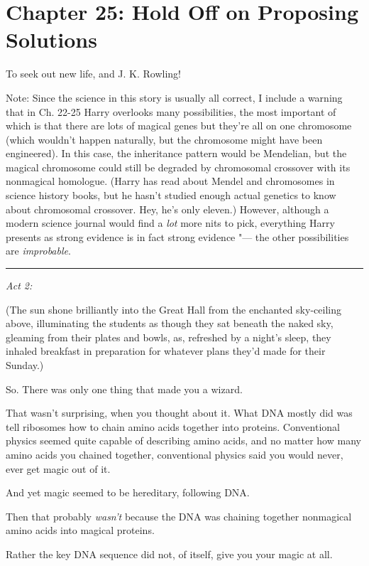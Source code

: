 \chapter{Chapter 25: Hold Off on Proposing Solutions}
To seek out new life, and J. K. Rowling!

Note: Since the science in this story is usually all correct, I include
a warning that in Ch. 22-25 Harry overlooks many possibilities, the most
important of which is that there are lots of magical genes but they're
all on one chromosome (which wouldn't happen naturally, but the
chromosome might have been engineered). In this case, the inheritance
pattern would be Mendelian, but the magical chromosome could still be
degraded by chromosomal crossover with its nonmagical homologue. (Harry
has read about Mendel and chromosomes in science history books, but he
hasn't studied enough actual genetics to know about chromosomal
crossover. Hey, he's only eleven.) However, although a modern science
journal would find a \emph{lot} more nits to pick, everything Harry
presents as strong evidence is in fact strong evidence "--- the other
possibilities are \emph{improbable}.

\begin{center}\rule{3in}{0.4pt}\end{center}

\emph{Act 2:}

(The sun shone brilliantly into the Great Hall from the enchanted
sky-ceiling above, illuminating the students as though they sat beneath
the naked sky, gleaming from their plates and bowls, as, refreshed by a
night's sleep, they inhaled breakfast in preparation for whatever plans
they'd made for their Sunday.)

So. There was only one thing that made you a wizard.

That wasn't surprising, when you thought about it. What DNA mostly did
was tell ribosomes how to chain amino acids together into proteins.
Conventional physics seemed quite capable of describing amino acids, and
no matter how many amino acids you chained together, conventional
physics said you would never, ever get magic out of it.

And yet magic seemed to be hereditary, following DNA.

Then that probably \emph{wasn't} because the DNA was chaining together
nonmagical amino acids into magical proteins.

Rather the key DNA sequence did not, of itself, give you your magic at
all.

